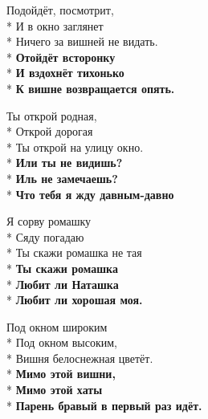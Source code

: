 \medskip

\begin{minipage}{\linewidth}
Подойдёт, посмотрит,\\*
И в окно заглянет\\*
Ничего за вишней не видать.\\*
\textbf{Отойдёт всторонку}\\*
\textbf{И вздохнёт тихонько}\\*
\textbf{К вишне возвращается опять.}\\
\end{minipage}\par\medskip\nobreak

\medskip

\begin{minipage}{\linewidth}
Ты открой родная,\\*
Открой дорогая\\*
Ты открой на улицу окно.\\*
\textbf{Или ты не видишь?}\\*
\textbf{Иль не замечаешь?}\\*
\textbf{Что тебя я жду давным-давно}\\
\end{minipage}\par\medskip\nobreak

\medskip

\begin{minipage}{\linewidth}
Я сорву ромашку\\*
Сяду погадаю\\*
Ты скажи ромашка не тая\\*
\textbf{Ты скажи ромашка}\\*
\textbf{Любит ли Наташка}\\*
\textbf{Любит ли хорошая моя.}\\
\end{minipage}\par\medskip\nobreak

\medskip

\begin{minipage}{\linewidth}
Под окном широким\\*
Под окном высоким,\\*
Вишня белоснежная цветёт.\\*
\textbf{Мимо этой вишни,}\\*
\textbf{Мимо этой хаты}\\*
\textbf{Парень бравый в первый раз идёт.}\\
\end{minipage}

